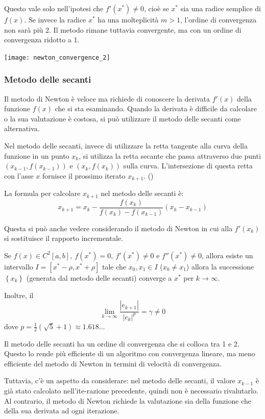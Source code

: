 \documentclass{article}
\begin{document}
Questo vale solo nell'ipotesi che $f'(x^*)\neq0$, cioè se $x^*$ sia una radice
semplice di $f(x)$. Se invece la radice $x^*$ ha una molteplicità $m>1$,
l'ordine di convergenza non sarà più 2. Il metodo rimane tuttavia convergente,
ma con un ordine di convergenza ridotto a 1.
\begin{center}
    \texttt{[image: newton\_convergence\_2]}
\end{center}
\subsubsection{Metodo delle secanti}
Il metodo di Newton è veloce ma richiede di conoscere la derivata $f'(x)$
della funzione $f(x)$ che si sta esaminando. Quando la derivata è difficile da
calcolare o la sua valutazione è costosa, si può utilizzare il metodo delle
secanti come alternativa.

Nel metodo delle secanti, invece di utilizzare la retta tangente alla curva
della funzione in un punto $x_k$, si utilizza la retta secante che passa
attraverso due punti $(x_{k-1}, f(x_{k-1}))$ e $(x_k, f(x_k))$ sulla curva.
L'intersezione di questa retta con l'asse $x$ fornisce il prossimo iterato
$x_{k+1}$. ()

La formula per calcolare $x_{k+1}$ nel metodo delle secanti è:
$$x_{k+1}=x_k-\frac{f(x_k)}{f(x_k)-f(x_{k-1})}(x_k-x_{k-1})$$

Questa si può anche vedere considerando il metodo di Newton in cui alla
$f'(x_k)$ si sostituisce il rapporto incrementale.

\begin{theorem}
    Se $f(x)\in C^2[a,b],\ f(x^*)=0,\ f'(x^*)\neq0\text{ e }f''(x^*)\neq0$,
    allora esiste un intervallo $I=[x^*-\rho,x^*+\rho]$ tale che $x_0,x_1\in
    I$ ($x_0\neq x_1$) allora la successione $\left\{x_k\right\}$ (generata dal metodo delle
    secanti) converge a $x^*$ per $k\to\infty$.
    
    Inoltre, il 
    $$\lim_{k\to\infty}\frac{\left\lvert e_{k+1}\right\rvert}{\left\lvert
    e_k\right\rvert^p}=\gamma\neq0$$
    dove $p=\frac{1}{2}(\sqrt{5}+1)\approx1.618\ldots$
\end{theorem}

Il metodo delle secanti ha un ordine di convergenza che si colloca tra 1 e 2.
Questo lo rende  più efficiente di un algoritmo con convergenza lineare, ma
meno efficiente del metodo di Newton in termini di velocità di convergenza.

Tuttavia, c'è un aspetto da considerare: nel metodo delle secanti, il valore
$x_{k-1}$ è già stato calcolato nell'ite-razione precedente, quindi non è
necessario rivalutarlo. Al contrario, il metodo di Newton richiede la
valutazione sia della funzione che della sua derivata ad ogni iterazione.
\end{document}
